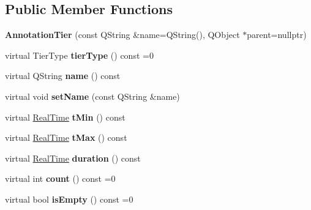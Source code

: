 \subsection*{Public Member Functions}
\begin{DoxyCompactItemize}
\item 
\mbox{\label{class_annotation_tier_af59a01566de15fb6f767d14da6e34a94}} 
{\bfseries Annotation\+Tier} (const Q\+String \&name=Q\+String(), Q\+Object $\ast$parent=nullptr)
\item 
\mbox{\label{class_annotation_tier_abde1704c32f26e05f946c4eb79cf2948}} 
virtual Tier\+Type {\bfseries tier\+Type} () const =0
\item 
\mbox{\label{class_annotation_tier_a6588948ba81099274eb55e8813fbbd88}} 
virtual Q\+String {\bfseries name} () const
\item 
\mbox{\label{class_annotation_tier_ada164999ed11f552b9ed196743f30c43}} 
virtual void {\bfseries set\+Name} (const Q\+String \&name)
\item 
\mbox{\label{class_annotation_tier_afaf3e5815e8c21678abaf1766a317de4}} 
virtual \hyperlink{struct_real_time}{Real\+Time} {\bfseries t\+Min} () const
\item 
\mbox{\label{class_annotation_tier_a4df732bb51ad92f493900e0d1d822dcf}} 
virtual \hyperlink{struct_real_time}{Real\+Time} {\bfseries t\+Max} () const
\item 
\mbox{\label{class_annotation_tier_a2afaa711c02f66e632f9841218836233}} 
virtual \hyperlink{struct_real_time}{Real\+Time} {\bfseries duration} () const
\item 
\mbox{\label{class_annotation_tier_a53d2439519ccda4962ba2c35c76cab53}} 
virtual int {\bfseries count} () const =0
\item 
\mbox{\label{class_annotation_tier_a0f545d0930ead88cb4e9fb01a5ed5097}} 
virtual bool {\bfseries is\+Empty} () const =0
\item 
\mbox{\label{class_annotation_tier_ae83ced90eff441f3392837b310cfa07d}} 

\end{DoxyCompactItemize}
